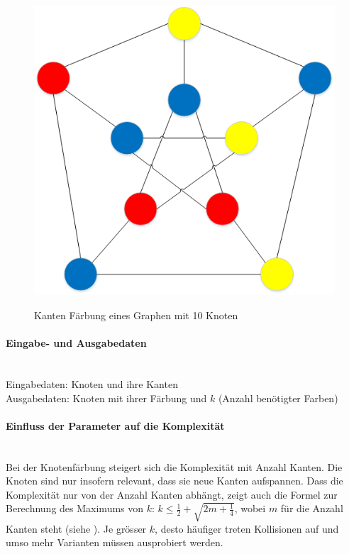 \begin{figure}[ht]
{  \includegraphics[scale=0.5]{images/visio/graph_faerbung_correct.png}
  \label{fig:graph_faerbung_correct}
}
\caption[Kanten Färbung eines Graphen mit 10 Knoten]{Kanten Färbung eines Graphen mit 10 Knoten \selfmade{}}
\label{fig:graph_faerbung}
\end{figure}

\FloatBarrier 
	\paragraph{Eingabe- und Ausgabedaten}\mbox{}\\
	Eingabedaten: Knoten und ihre Kanten\\
	Ausgabedaten: Knoten mit ihrer Färbung und $k$ (Anzahl benötigter Farben)

	\paragraph{Einfluss der Parameter auf die Komplexität}\mbox{}\\
	Bei der Knotenfärbung steigert sich die Komplexität mit Anzahl Kanten. Die Knoten sind nur insofern relevant, dass sie neue Kanten aufspannen. Dass die Komplexität nur von der Anzahl Kanten 
	abhängt, zeigt auch die Formel zur Berechnung des Maximums von $k$: $k \le \frac{1}{2} + \sqrt{2m + \frac{1}{4}}$, wobei $m$ für die Anzahl Kanten steht 
	(siehe \cite{seminar_rainer_graph}). Je grösser $k$, desto häufiger treten Kollisionen auf und umso mehr Varianten müssen ausprobiert werden.

